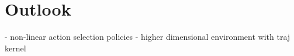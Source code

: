 \chapter{Outlook}
\label{chap:7}
%
- non-linear action selection policies
- higher dimensional environment with traj kernel
